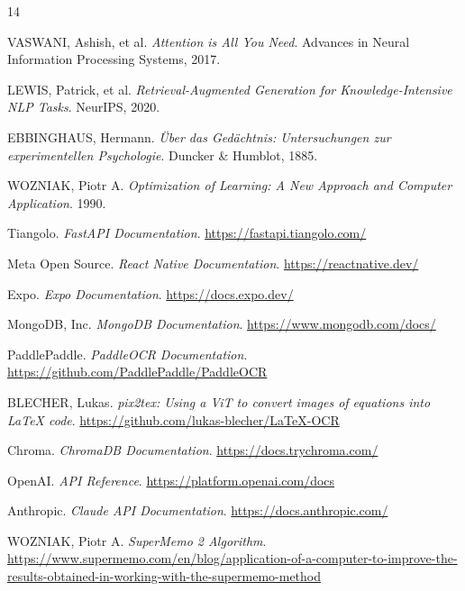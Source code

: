 \documentclass[12pt,a4paper]{report}
\begin{document}
\begin{thebibliography}{14}

VASWANI, Ashish, et al. \textit{Attention is All You Need}. Advances in Neural Information Processing Systems, 2017.

LEWIS, Patrick, et al. \textit{Retrieval-Augmented Generation for Knowledge-Intensive NLP Tasks}. NeurIPS, 2020.

EBBINGHAUS, Hermann. \textit{Über das Gedächtnis: Untersuchungen zur experimentellen Psychologie}. Duncker \& Humblot, 1885.

WOZNIAK, Piotr A. \textit{Optimization of Learning: A New Approach and Computer Application}. 1990.

Tiangolo. \textit{FastAPI Documentation}. \url{https://fastapi.tiangolo.com/}

Meta Open Source. \textit{React Native Documentation}. \url{https://reactnative.dev/}

Expo. \textit{Expo Documentation}. \url{https://docs.expo.dev/}

MongoDB, Inc. \textit{MongoDB Documentation}. \url{https://www.mongodb.com/docs/}

PaddlePaddle. \textit{PaddleOCR Documentation}. \url{https://github.com/PaddlePaddle/PaddleOCR}

BLECHER, Lukas. \textit{pix2tex: Using a ViT to convert images of equations into LaTeX code}. \url{https://github.com/lukas-blecher/LaTeX-OCR}

Chroma. \textit{ChromaDB Documentation}. \url{https://docs.trychroma.com/}

OpenAI. \textit{API Reference}. \url{https://platform.openai.com/docs}

Anthropic. \textit{Claude API Documentation}. \url{https://docs.anthropic.com/}

WOZNIAK, Piotr A. \textit{SuperMemo 2 Algorithm}. \url{https://www.supermemo.com/en/blog/application-of-a-computer-to-improve-the-results-obtained-in-working-with-the-supermemo-method}

\end{thebibliography}
\end{document}

